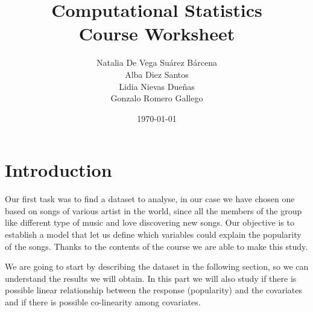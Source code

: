 \documentclass[11pt]{article}\usepackage[]{graphicx}\usepackage[]{xcolor}
\title{\Huge \textbf{Computational Statistics} \\[10pt]
       \Large Course Worksheet}
\author{ Natalia De Vega Suárez Bárcena \\
         Alba Diez Santos\\
         Lidia Nievas Dueñas\\
         Gonzalo Romero Gallego}
\date{\today}
\begin{document}
\begin{titlepage}
  \thispagestyle{empty}
\end{titlepage}



\tableofcontents
\newpage

\section{Introduction}




Our first task was to find a dataset to analyse, in our case we have chosen one based on songs of various artist in the world, since all the members of the group like different type of music and love discovering new songs. Our objective is to establish a model that let us define which variables could explain the popularity of the songs. Thanks to the contents of the course we are able to make this study. 

We are going to start by describing the dataset in the following section, so we can understand the results we will obtain. In this part we will also study if there is possible linear relationship between the response (popularity) and the covariates and if there is possible co-linearity among covariates. 
\end{document}
